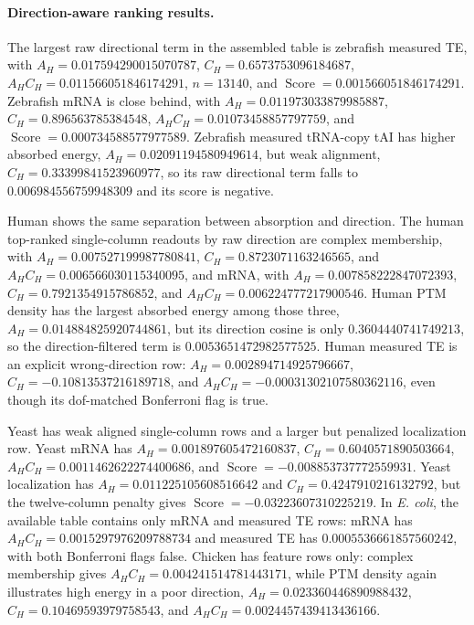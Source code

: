 \paragraph{Direction-aware ranking results.}
The largest raw directional term in the assembled table is zebrafish measured TE, with $A_H=0.017594290015070787$, $C_H=0.6573753096184687$, $A_HC_H=0.011566051846174291$, $n=13140$, and $\operatorname{Score}=0.001566051846174291$.  Zebrafish mRNA is close behind, with $A_H=0.011973033879985887$, $C_H=0.896563785384548$, $A_HC_H=0.01073458857797759$, and $\operatorname{Score}=0.000734588577977589$.  Zebrafish measured tRNA-copy tAI has higher absorbed energy, $A_H=0.02091194580949614$, but weak alignment, $C_H=0.33399841523960977$, so its raw directional term falls to $0.006984556759948309$ and its score is negative.

Human shows the same separation between absorption and direction.  The human top-ranked single-column readouts by raw direction are complex membership, with $A_H=0.007527199987780841$, $C_H=0.8723071163246565$, and $A_HC_H=0.006566030115340095$, and mRNA, with $A_H=0.007858222847072393$, $C_H=0.7921354915786852$, and $A_HC_H=0.006224777217900546$.  Human PTM density has the largest absorbed energy among those three, $A_H=0.014884825920744861$, but its direction cosine is only $0.3604440741749213$, so the direction-filtered term is $0.0053651472982577525$.  Human measured TE is an explicit wrong-direction row: $A_H=0.002894714925796667$, $C_H=-0.10813537216189718$, and $A_HC_H=-0.00031302107580362116$, even though its dof-matched Bonferroni flag is true.

Yeast has weak aligned single-column rows and a larger but penalized localization row.  Yeast mRNA has $A_H=0.001897605472160837$, $C_H=0.6040571890503664$, $A_HC_H=0.0011462622274400686$, and $\operatorname{Score}=-0.008853737772559931$.  Yeast localization has $A_H=0.011225105608516642$ and $C_H=0.4247910216132792$, but the twelve-column penalty gives $\operatorname{Score}=-0.03223607310225219$.  In \emph{E. coli}, the available table contains only mRNA and measured TE rows: mRNA has $A_HC_H=0.0015297976209788734$ and measured TE has $0.0005536661857560242$, with both Bonferroni flags false.  Chicken has feature rows only: complex membership gives $A_HC_H=0.004241514781443171$, while PTM density again illustrates high energy in a poor direction, $A_H=0.023360446890988432$, $C_H=0.10469593979758543$, and $A_HC_H=0.0024457439413436166$.

